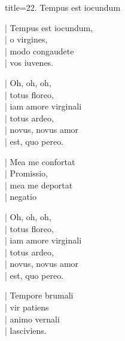 \begin{song}{title={22. Tempus est iocundum}}

\begin{keepverse}
  \startline| Tempus est iocundum,\\
  \startline| o virgines,\\
  \startline| modo congaudete\\
  \startline| vos iuvenes.\\
\end{keepverse}

\begin{keepverse}
  \startline| Oh, oh, oh,\\
  \startline| totus floreo,\\
  \startline| iam amore virginali\\
  \startline| totus ardeo,\\
  \startline| novus, novus amor\\
  \startline| est, quo pereo.\\
\end{keepverse}

\begin{keepverse}
  \startline| Mea me confortat\\
  \startline| Promissio,\\
  \startline| mea me deportat\\
  \startline| negatio\\
\end{keepverse}

\begin{keepverse}
  \startline| Oh, oh, oh,\\
  \startline| totus floreo,\\
  \startline| iam amore virginali\\
  \startline| totus ardeo,\\
  \startline| novus, novus amor\\
  \startline| est, quo pereo.\\
\end{keepverse}

\begin{keepverse}
  \startline| Tempore brumali\\
  \startline| vir patiens\\
  \startline| animo vernali\\
  \startline| lasciviens.\\
\end{keepverse}


\end{song}
